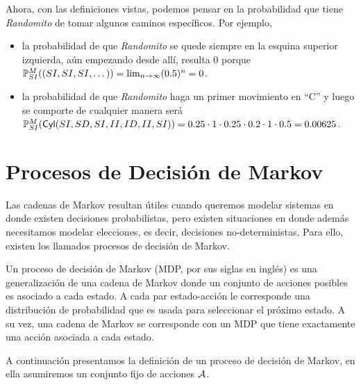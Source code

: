 Ahora, con las definiciones vistas, podemos pensar en la probabilidad que tiene
\emph{Randomito} de tomar algunos caminos específicos. Por ejemplo,

\begin{itemize}
	\item la probabilidad de que \emph{Randomito} se quede siempre en la esquina superior
	      izquierda, aún empezando desde allí, resulta 0 porque $\mathbb{P}^M_{SI}((SI, SI,
		      SI, \dots)) = \lim_{n\to \infty} (0.5)^n = 0$.
	\item la probabilidad de que \emph{Randomito} haga un primer movimiento en ``C'' y
	      luego se comporte de cualquier manera será $\mathbb{P}^M_{SI}(\textsf{Cyl}(SI, SD, SI, II,
		      ID, II, SI)) = 0.25 \cdot 1 \cdot 0.25 \cdot 0.2 \cdot 1 \cdot 0.5 = 0.00625$.
\end{itemize}



\section{Procesos de Decisión de Markov}

Las cadenas de Markov resultan útiles cuando queremos modelar sistemas en donde
existen decisiones probabilistas, pero existen situaciones en donde además
necesitamos modelar elecciones, es decir, decisiones no-deterministas. Para
ello, existen los llamados procesos de decisión de Markov.

Un proceso de decisión de Markov (MDP, por sus siglas en inglés) es una
generalización de una cadena de Markov donde un conjunto de acciones posibles
es asociado a cada estado. A cada par estado-acción le corresponde una
distribución de probabilidad que es usada para seleccionar el próximo estado. A
su vez, una cadena de Markov se corresponde con un MDP que tiene exactamente
una acción asociada a cada estado.

A continuación presentamos la definición de un proceso de decisión de Markov,
en ella asumiremos un conjunto fijo de acciones $\mathcal{A}$.

